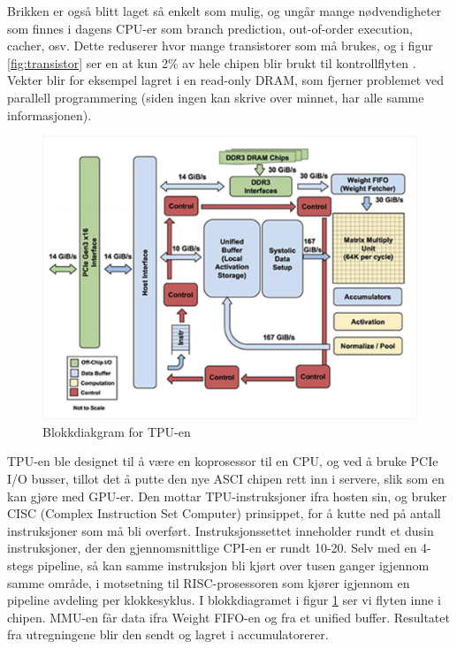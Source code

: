 Brikken er også blitt laget så enkelt som mulig, og ungår mange nødvendigheter som finnes i dagens CPU-er som branch prediction, out-of-order execution, cacher, osv. Dette reduserer hvor mange transistorer som må brukes, og  i figur \ref{fig:transistor} ser en at kun 2\% av hele chipen blir brukt til kontrollflyten \cite{tpu_main}. Vekter blir for eksempel lagret i en read-only DRAM, som fjerner problemet ved parallell programmering (siden ingen kan skrive over minnet, har alle samme informasjonen).

\begin{figure}[ht]
    \centering
    \includegraphics[width=\textwidth]{images/tpu_block.jpg}
    \caption{Blokkdiakgram for TPU-en}
    \label{fig:blokk}
\end{figure}

TPU-en ble designet til å være en koprosessor til en CPU, og ved å bruke PCIe I/O busser, tillot det å putte den nye ASCI chipen rett inn i servere, slik som en kan gjøre med GPU-er. Den mottar TPU-instruksjoner ifra hosten sin, og bruker CISC (Complex Instruction Set Computer) prinsippet, for å kutte ned på antall instruksjoner som må bli overført. Instruksjonssettet inneholder rundt et dusin instruksjoner, der den gjennomsnittlige CPI-en er rundt 10-20. Selv med en 4-stegs pipeline, så kan samme instruksjon bli kjørt over tusen ganger igjennom samme område, i motsetning til RISC-prosessoren som kjører igjennom en pipeline avdeling per klokkesyklus. 
I blokkdiagramet i figur \ref{fig:blokk} ser vi flyten inne i chipen. MMU-en får data ifra Weight FIFO-en og fra et unified buffer. Resultatet fra utregningene blir den sendt og lagret i accumulatorerer.

